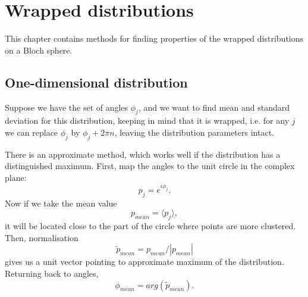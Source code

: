 \section{Wrapped distributions}


This chapter contains methods for finding properties of the wrapped distributions on a Bloch sphere.


\subsection{One-dimensional distribution}

Suppose we have the set of angles $\phi_j$, and we want to find mean and standard deviation for this distribution,
keeping in mind that it is wrapped,
i.e. for any $j$ we can replace $\phi_j$ by $\phi_j + 2\pi n$, leaving the distribution parameters intact.

There is an approximate method, which works well if the distribution has a distinguished maximum.
First, map the angles to the unit circle in the complex plane:
\[
	p_j = e^{i\phi_j}.
\]
Now if we take the mean value
\[
	p_{mean} = \langle p_j \rangle,
\]
it will be located close to the part of the circle where points are more clustered.
Then, normalisation
\[
	\tilde{p}_{mean} = p_{mean} / | p_{mean} |
\]
gives us a unit vector pointing to approximate maximum of the distribution.
Returning back to angles,
\[
	\phi_{mean} = arg(\tilde{p}_{mean}).
\]
